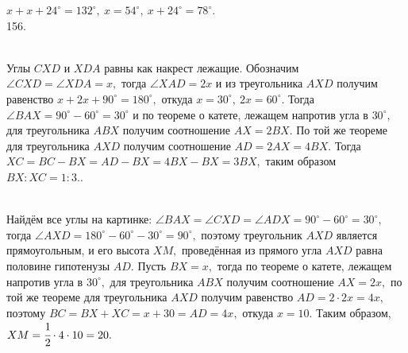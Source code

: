 \documentclass[12pt]{article}
\begin{document}
$x+x+24^\circ=132^\circ,\ x=54^\circ,\ x+24^\circ=78^\circ.$\\
156. \begin{figure}[ht!]
\end{figure}\\
Углы $CXD$ и $XDA$ равны как накрест лежащие. Обозначим $\angle CXD=\angle XDA=x,$ тогда $\angle XAD=2x$ и из треугольника $AXD$ получим равенство $x+2x+90^\circ=180^\circ,$ откуда $x=30^\circ,\ 2x=60^\circ.$ Тогда $\angle BAX=90^\circ-60^\circ=30^\circ$ и по теореме о катете, лежащем напротив угла в $30^\circ,$ для треугольника $ABX$ получим соотношение $AX=2BX.$ По той же теореме для треугольника $AXD$ получим соотношение $AD=2AX=4BX.$ Тогда $XC=BC-BX=AD-BX=4BX-BX=3BX,$ таким образом $BX:XC=1:3.$\newpage{}. \begin{figure}[ht!]
\end{figure}\\
Найдём все углы на картинке: $\angle BAX=\angle CXD=\angle ADX=90^\circ-60^\circ=30^\circ,$ тогда $\angle AXD=180^\circ-60^\circ-30^\circ=90^\circ,$ поэтому треугольник $AXD$ является прямоугольным, и его высота $XM,$ проведённая из прямого угла $AXD$ равна половине гипотенузы $AD.$ Пусть $BX=x,$ тогда по теореме о катете, лежащем напротив угла в $30^\circ,$ для треугольника $ABX$ получим соотношение $AX=2x,$ по той же теореме для треугольника $AXD$ получим равенство $AD=2\cdot2x=4x,$ поэтому $BC=BX+XC=x+30=AD=4x,$ откуда $x=10.$ Таким образом, $XM=\cfrac{1}{2}\cdot4\cdot10=20.$\\
\end{document}
